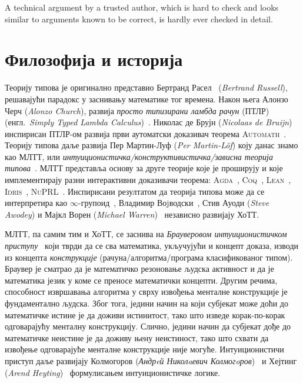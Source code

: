 \documentclass[12pt,oneside]{memoir}
\begin{document}
\begin{displayquote}
    A technical argument by a trusted author, which is hard to check and looks similar to arguments known to be correct, is hardly ever checked in detail.
\end{displayquote}

\section{Филозофија и историја}
\label{sec:phil}

Теорију типова је оригинално представио Бертранд Расел~\cite{rus08} (\emph{Bertrand Russell}), решавајући парадокс у заснивању математике тог времена. Након њега Алонзо Черч (\emph{Alonzo Church}), развија \emph{просто типизирани ламбда рачун} (ПТЛР) (енгл.~\emph{Simply Typed Lambda Calculus})~\cite{crc40, crc41}. Николас де Брујн (\emph{Nicolaas de Bruijn}) инспирисан ПТЛР-ом развија први аутоматски доказивач теорема \textsc{Automath}~\cite{automath}. Теорију типова даље развија Пер Мартин-Луф (\emph{Per Martin-Löf}) коју данас знамо као МЛТТ, или \emph{интуиционистичка/конструктивистичка/зависна теорија типова}~\cite{pml75, pml82, pml84, pml93, pml98}. МЛТТ представља основу за друге теорије које је проширују и које имплементирају разни интерактивни доказивачи теорема: \textsc{Agda}~\cite{norell07, norell09}, \textsc{Coq}~\cite{coq}, \textsc{Lean}~\cite{lean, lean4}, \textsc{Idris}~\cite{bra13}, \textsc{NuPRL}~\cite{nuprl86}. Инспирисани резултатом да теорија типова може да се интерпретира као $\infty$-групоид~\cite{hs98}, Владимир Воjводски~\cite{vlad06}, Стив Ауоди (\emph{Steve Awodey}) и Мајкл Ворен (\emph{Michael Warren})~\cite{aw09} независно развијају ХоТТ.

МЛТТ, па самим тим и ХоТТ, се заснива на \emph{Брауверовом интуиционистичком приступу}~\cite{brw, brw2} који тврди да се сва математика, укључујући и концепт доказа, изводи из концепта \emph{конструкције} (рачуна/алгоритма/програма класификованог типом). Браувер је сматрао да је математичко резоновање људска активност и да је математика језик у коме се преносе математички концепти. Другим речима, способност извршавања алгоритма у сврху извођења менталне конструкције је фундаментално људска. Због тога, једини начин на који субјекат може доћи до математичке истине је да доживи истинитост, тако што изведе корак-по-корак одговарајућу менталну конструкцију. Слично, једини начин да субјекат дође до математичке неистине је да доживу њену неистиност, тако што схвати да извођење одговарајуће менталне конструкције није могуће. Интуиционистичи приступ даље развијају Колмогоров (\emph{Андрeй Николaевич Колмогoров})~\cite{kol32} и Хејтинг (\emph{Arend Heyting})~\cite{hey66} формулисањем интуиционистичке логике.
\end{document}
